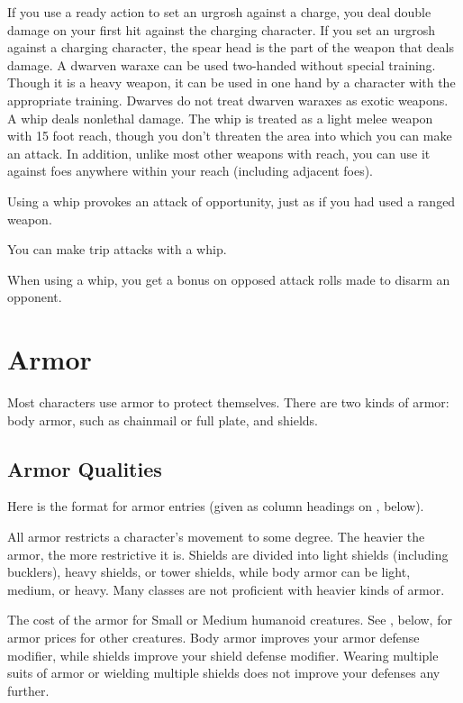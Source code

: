 \par If you use a ready action to set an urgrosh against a charge, you deal double damage on your first hit against the charging character. If you set an urgrosh against a charging character, the spear head is the part of the weapon that deals damage.
 A dwarven waraxe can be used two-handed without special training. Though it is a heavy weapon, it can be used in one hand by a character with the appropriate training. Dwarves do not treat dwarven waraxes as exotic weapons.
 A whip deals nonlethal damage. The whip is treated as a light melee weapon with 15 foot reach, though you don't threaten the area into which you can make an attack. In addition, unlike most other weapons with reach, you can use it against foes anywhere within your reach (including adjacent foes).
\par Using a whip provokes an attack of opportunity, just as if you had used a ranged weapon.
\par You can make trip attacks with a whip.
\par When using a whip, you get a  bonus on opposed attack rolls made to disarm an opponent.

\section{Armor}

Most characters use armor to protect themselves. There are two kinds of armor: body armor, such as chainmail or full plate, and shields.

\subsection{Armor Qualities}
\par Here is the format for armor entries (given as column headings on , below).

 All armor restricts a character's movement to some degree. The heavier the armor, the more restrictive it is. Shields are divided into light shields (including bucklers), heavy shields, or tower shields, while body armor can be light, medium, or heavy. Many classes are not proficient with heavier kinds of armor.

 The cost of the armor for Small or Medium humanoid
creatures. See , below, for armor prices for other creatures.
 Body armor improves your armor defense modifier, while shields improve your shield defense modifier. Wearing multiple suits of armor or wielding multiple shields does not improve your defenses any further.

